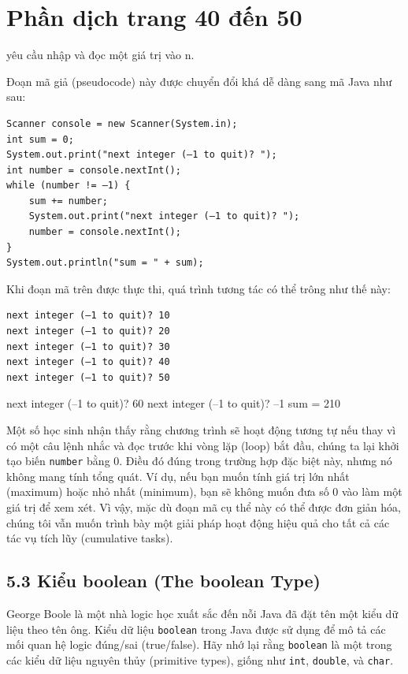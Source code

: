 \section{Phần dịch trang 40 đến 50}
yêu cầu nhập và đọc một giá trị vào n.


Đoạn mã giả (pseudocode) này được chuyển đổi khá dễ dàng sang mã Java như sau:

\begin{verbatim}
Scanner console = new Scanner(System.in);
int sum = 0;
System.out.print("next integer (–1 to quit)? ");
int number = console.nextInt();
while (number != –1) {
    sum += number;
    System.out.print("next integer (–1 to quit)? ");
    number = console.nextInt();
}
System.out.println("sum = " + sum);
\end{verbatim}


Khi đoạn mã trên được thực thi, quá trình tương tác có thể trông như thế này:

\begin{verbatim}
next integer (–1 to quit)? 10 
next integer (–1 to quit)? 20 
next integer (–1 to quit)? 30 
next integer (–1 to quit)? 40 
next integer (–1 to quit)? 50 
\end{verbatim}

next integer (–1 to quit)? 60 
next integer (–1 to quit)? –1 
sum = 210 


Một số học sinh nhận thấy rằng chương trình sẽ hoạt động tương tự nếu thay vì có một câu lệnh nhắc và đọc trước khi vòng lặp (loop) bắt đầu, chúng ta lại khởi tạo biến \texttt{number} bằng 0. Điều đó đúng trong trường hợp đặc biệt này, nhưng nó không mang tính tổng quát. Ví dụ, nếu bạn muốn tính giá trị lớn nhất (maximum) hoặc nhỏ nhất (minimum), bạn sẽ không muốn đưa số 0 vào làm một giá trị để xem xét. Vì vậy, mặc dù đoạn mã cụ thể này có thể được đơn giản hóa, chúng tôi vẫn muốn trình bày một giải pháp hoạt động hiệu quả cho tất cả các tác vụ tích lũy (cumulative tasks).

\subsection*{5.3 Kiểu boolean (The boolean Type)}

George Boole là một nhà logic học xuất sắc đến nỗi Java đã đặt tên một kiểu dữ liệu theo tên ông. Kiểu dữ liệu \texttt{boolean} trong Java được sử dụng để mô tả các mối quan hệ logic đúng/sai (true/false). Hãy nhớ lại rằng \texttt{boolean} là một trong các kiểu dữ liệu nguyên thủy (primitive types), giống như \texttt{int}, \texttt{double}, và \texttt{char}.

